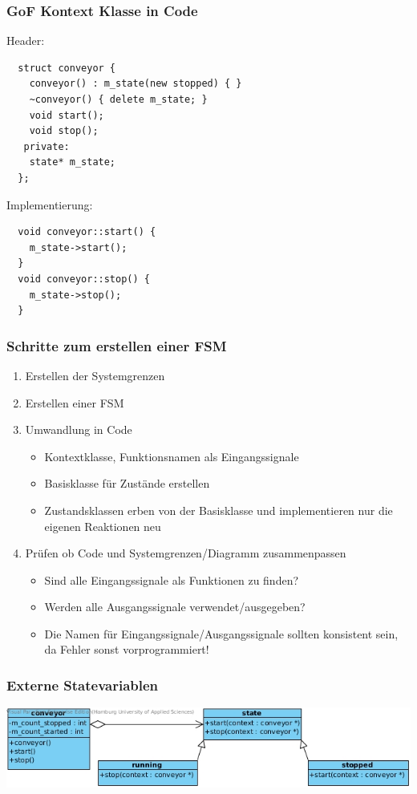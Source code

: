 \documentclass{beamer}
\begin{document}
\begin{frame}[fragile]
 \frametitle{GoF Kontext Klasse in Code}
 Header:
 \begin{lstlisting}
  struct conveyor {
    conveyor() : m_state(new stopped) { }
    ~conveyor() { delete m_state; }
    void start();
    void stop();
   private:
    state* m_state;
  };
 \end{lstlisting}
 Implementierung:
 \begin{lstlisting}
  void conveyor::start() {
    m_state->start();
  }
  void conveyor::stop() {
    m_state->stop();
  }
 \end{lstlisting}
\end{frame}

\begin{frame}
 \frametitle{Schritte zum erstellen einer FSM}
 \begin{enumerate}
  \item Erstellen der Systemgrenzen
  \item Erstellen einer FSM
  \item Umwandlung in Code
  \begin{itemize}
   \item Kontextklasse, Funktionsnamen als Eingangssignale
   \item Basisklasse für Zustände erstellen
   \item Zustandsklassen erben von der Basisklasse und implementieren nur die eigenen Reaktionen neu
  \end{itemize}
  \item Pr\"ufen ob Code und Systemgrenzen/Diagramm zusammenpassen
  \begin{itemize}
   \item Sind alle Eingangssignale als Funktionen zu finden?
   \item Werden alle Ausgangssignale verwendet/ausgegeben?
   \item Die Namen f\"ur Eingangssignale/Ausgangssignale sollten konsistent sein, da Fehler sonst vorprogrammiert!
  \end{itemize}
 \end{enumerate}
\end{frame}

\begin{frame}
 \frametitle{Externe Statevariablen}
  \includegraphics[scale=.44]{img/fsm_externe_state_var.jpg}
\end{frame}
\end{document}
